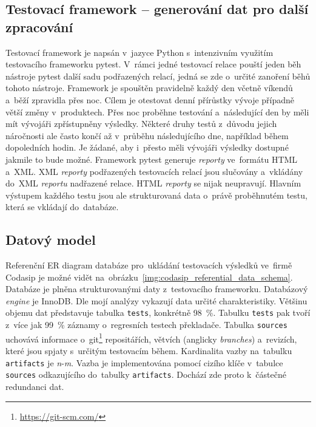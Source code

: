 \subsection{Testovací framework -- generování dat pro další zpracování}
\label{subsection:Testovaci_framework}
Testovací framework je napsán v~jazyce Python s~intenzivním využitím testovacího frameworku pytest. V~rámci jedné
testovací relace pouští jeden běh nástroje pytest další sadu podřazených relací, jedná se zde o~určité zanoření běhů
tohoto nástroje. Framework je spouštěn pravidelně každý den včetně víkendů a~běží zpravidla přes noc. Cílem je
otestovat denní přírůstky vývoje případně větší změny v~produktech. Přes noc proběhne testování a~následující den by
měli mít vývojáři zpřístupněny výsledky. Některé druhy testů z~důvodu jejich náročnosti ale často končí až v~průběhu
následujícího dne, například během dopoledních hodin. Je žádané, aby i~přesto měli vývojáři výsledky dostupné
jakmile to bude možné. Framework pytest generuje \textit{reporty} ve~formátu HTML a~XML. XML \textit{reporty} podřazených testovacích
relací jsou slučovány a~vkládány do~XML \textit{reportu} nadřazené relace. HTML \textit{reporty} se nijak neupravují. Hlavním výstupem každého testu jsou ale strukturovaná data o~právě proběhnutém testu, která se vkládají do~databáze.

\subsection{Datový model}
\label{subsection:datovy_model}
Referenční ER diagram databáze pro~ukládání testovacích výsledků ve~firmě Codasip je možné vidět
na~obrázku~\ref{img:codasip_referential_data_schema}.
Databáze je plněna strukturovanými daty z~testovacího frameworku. Databázový \textit{engine} je InnoDB. Dle mojí
analýzy vykazují data určité charakteristiky. Většinu objemu dat představuje tabulka \texttt{tests}, konkrétně
98~\%. Tabulku \texttt{tests} pak tvoří z~více jak 99~\% záznamy o~regresních testech překladače. Tabulka
\texttt{sources} uchovává informace o~git\footnote{\href{https://git-scm.com/}{https://git-scm.com/}} repositářích,
větvích (anglicky \textit{branches}) a~revizích, které jsou spjaty s~určitým testovacím během. Kardinalita vazby
na~tabulku \texttt{artifacts} je \textit{n}-\textit{m}. Vazba je implementována pomocí cizího klíče v~tabulce
\texttt{sources} odkazujícího do~tabulky \texttt{artifacts}. Dochází zde proto k~částečné redundanci dat.

